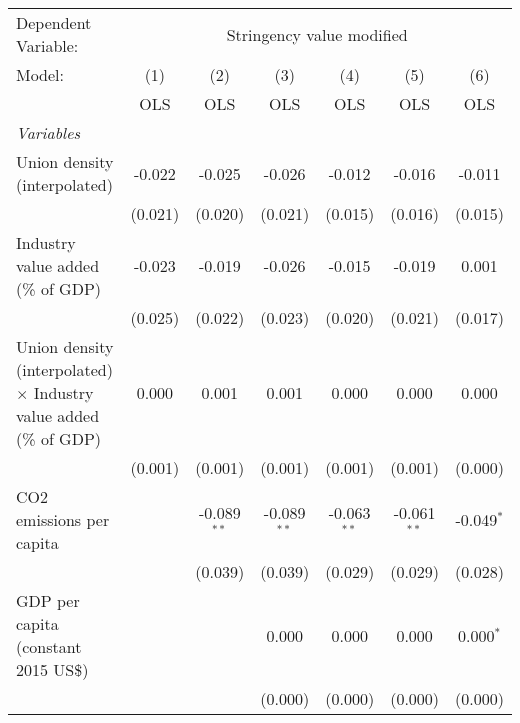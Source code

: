 
\begingroup
\centering
\begin{tabular}{lcccccc}
   \toprule
   Dependent Variable: & \multicolumn{6}{c}{Stringency value modified}\\
   Model:                                                                   & (1)     & (2)           & (3)           & (4)           & (5)           & (6)\\  
                                                                            &  OLS    & OLS           & OLS           & OLS           & OLS           & OLS\\  
   \midrule
   \emph{Variables}\\
   Union density (interpolated)                                             & -0.022  & -0.025        & -0.026        & -0.012        & -0.016        & -0.011\\   
                                                                            & (0.021) & (0.020)       & (0.021)       & (0.015)       & (0.016)       & (0.015)\\   
   Industry value added (\% of GDP)                                         & -0.023  & -0.019        & -0.026        & -0.015        & -0.019        & 0.001\\   
                                                                            & (0.025) & (0.022)       & (0.023)       & (0.020)       & (0.021)       & (0.017)\\   
   Union density (interpolated) $\times$ Industry value added (\% of GDP)   & 0.000   & 0.001         & 0.001         & 0.000         & 0.000         & 0.000\\   
                                                                            & (0.001) & (0.001)       & (0.001)       & (0.001)       & (0.001)       & (0.000)\\   
   CO2 emissions per capita                                                 &         & -0.089$^{**}$ & -0.089$^{**}$ & -0.063$^{**}$ & -0.061$^{**}$ & -0.049$^{*}$\\   
                                                                            &         & (0.039)       & (0.039)       & (0.029)       & (0.029)       & (0.028)\\   
   GDP per capita (constant 2015 US\$)                                      &         &               & 0.000         & 0.000         & 0.000         & 0.000$^{*}$\\   
                                                                            &         &               & (0.000)       & (0.000)       & (0.000)       & (0.000)\\   

\end{tabular}

